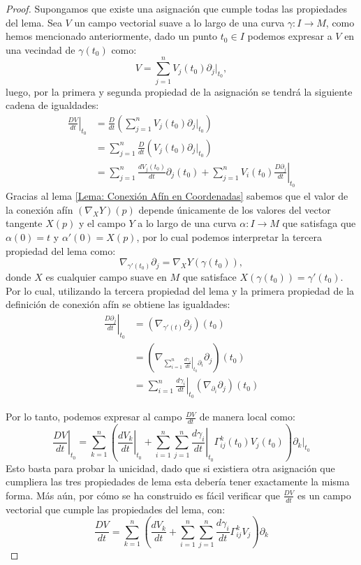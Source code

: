 \begin{proof}
	Supongamos que existe una asignación que cumple todas las propiedades del lema. Sea $V$ un campo vectorial suave a lo largo de una curva $\gamma: I \to M$, como hemos mencionado anteriormente, dado un punto $t_{0} \in I$ podemos expresar a $V$ en una vecindad de $\gamma(t_{0})$ como:
	\[
		V = \sum_{j=1}^{n} V_{j}(t_{0}) \partial_{j}|_{t_{0}},
	\]
	luego, por la primera y segunda propiedad de la asignación se tendrá la siguiente cadena de igualdades:
	\begin{align*}
		\left. \frac{DV}{dt} \right|_{t_{0}}
		 & = \frac{D}{dt} \left( \sum_{j=1}^{n} V_{j}(t_{0}) \partial_{j}|_{t_{0}} \right) \\
		 & = \sum_{j=1}^{n} \frac{D}{dt} ( V_{j}(t_{0}) \partial_{j}|_{t_{0}})             \\
		 & = \sum_{j=1}^{n} \frac{dV_{j}(t_{0})}{dt} \partial_{j}(t_{0})
		+ \sum_{j=1}^{n} V_{i}(t_{0}) \left. \frac{D\partial_{j}}{dt} \right|_{t_{0}}
	\end{align*}
	Gracias al lema \ref{Lema: Conexión Afín en Coordenadas} sabemos que el valor de la conexión afín $(\nabla_{X}Y)(p)$ depende únicamente de los valores del vector tangente $X(p)$ y el campo $Y$ a lo largo de una curva $\alpha: I \to M$ que satisfaga que $\alpha(0) = t$ y $\alpha'(0) = X(p)$, por lo cual podemos interpretar la tercera propiedad del lema como:
	\[
		\nabla_{\gamma'(t_{0})}\partial_{j} = \nabla_{X}Y (\gamma(t_{0})),
	\]
	donde $X$ es cualquier campo suave en $M$ que satisface $X(\gamma(t_{0})) = \gamma'(t_{0})$. Por lo cual, utilizando la tercera propiedad del lema y la primera propiedad de la definición de conexión afín se obtiene las igualdades:
	\begin{align*}
		\left. \frac{D\partial_{j}}{dt} \right|_{t_{0}}
		 & = (\nabla_{\gamma'(t)}\partial_{j})(t_{0})                                                                 \\
		 & = \left(
		\nabla_{\sum_{i=1}^{n} \left. \frac{d\gamma_{i}}{dt} \right|_{t_{0}}  \partial_{i}} \partial_{j}
		\right) (t_{0})                                                                                               \\
		 & = \sum_{i=1}^{n} \left. \frac{d\gamma_{i}}{dt} \right|_{t_{0}} (\nabla_{\partial_{i}} \partial_{j})(t_{0})
	\end{align*}

	Por lo tanto, podemos expresar al campo $\frac{DV}{dt}$ de manera local como:
	\[
		\left. \frac{DV}{dt} \right|_{t_{0}} =
		\sum_{k=1}^{n} \left(
		\left. \frac{dV_{k}}{dt} \right|_{t_{0}} +
		\sum_{i=1}^{n}\sum_{j=1}^{n} \left. \frac{d\gamma_{i}}{dt} \right|_{t_{0}}
		\Gamma_{ij}^{k}(t_{0}) V_{j}(t_{0})
		\right) \partial_{k}|_{t_0}
	\]
	Esto basta para probar la unicidad, dado que si existiera otra asignación que cumpliera las tres propiedades de lema esta debería tener exactamente la misma forma. Más aún, por cómo se ha construido es fácil verificar que $\frac{DV}{dt}$ es un campo vectorial que cumple las propiedades del lema, con:
	\[
		\frac{DV}{dt} = \sum_{k=1}^{n} \left(\frac{dV_{k}}{dt}
		+ \sum_{i=1}^{n}\sum_{j=1}^{n} \frac{d\gamma_{i}}{dt} \Gamma_{ij}^{k} V_{j}\right) \partial_{k}
	\]
\end{proof}

